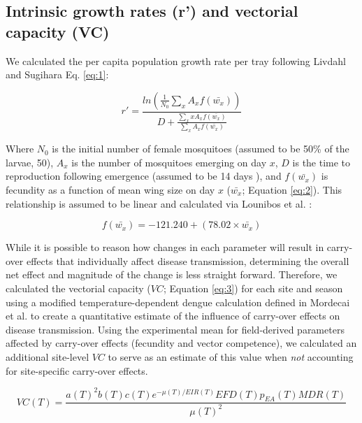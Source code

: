 \documentclass[doublespacing, linenumbers]{bmcart}
\begin{document}
\subsection*{Intrinsic growth rates (r') and vectorial capacity (VC)}

We calculated the per capita population growth rate per tray following Livdahl and Sugihara \cite{livdahl1984} {Eq. \ref{eq:1}}:

\begin{equation} \label{eq:1}
r' = \frac{ln(\frac{1}{N_0}\sum_{x}^{ }{A_x}f(\bar{w_x}))}{D+\frac{\sum_{x}^{ }xA_xf(\bar{w_x})}{\sum_{x}^{ }A_xf(\bar{w_x})}}
\end{equation}

Where $N_0$ is the initial number of female mosquitoes (assumed to be 50\% of the larvae, 50), $A_x$ is the number of mosquitoes emerging on day $x$, $D$ is the time to reproduction following emergence (assumed to be 14 days \cite{livdahl1991}), and $f(\bar{w_x})$ is fecundity as a function of mean wing size on day $x$ ($\bar{w_x}$; Equation \ref{eq:2}).
This relationship is assumed to be linear and calculated via Lounibos et al. \cite{lounibos2002}:

\begin{equation} \label{eq:2}
f(\bar{w_x}) = -121.240 + (78.02 \times \bar{w_x})
\end{equation}

While it is possible to reason how changes in each parameter will result in carry-over effects that individually affect disease transmission, determining the overall net effect and magnitude of the change is less straight forward.
Therefore, we calculated the vectorial capacity ($VC$; Equation \ref{eq:3}) for each site and season using a modified temperature-dependent dengue calculation defined in Mordecai et al. \cite{mordecai2017} to create a quantitative estimate of the influence of carry-over effects on disease transmission.
Using the experimental mean for field-derived parameters affected by carry-over effects (fecundity and vector competence), we calculated an additional site-level $VC$ to serve as an estimate of this value when \textit{not} accounting for site-specific carry-over effects.

\begin{equation} \label{eq:3}
VC(T) =\frac{a(T)^2b(T)c(T)e^{-\mu (T)/EIR(T)} EFD(T) p_{EA}(T) MDR(T)} {\mu(T)^2}
\end{equation}
\end{document}

